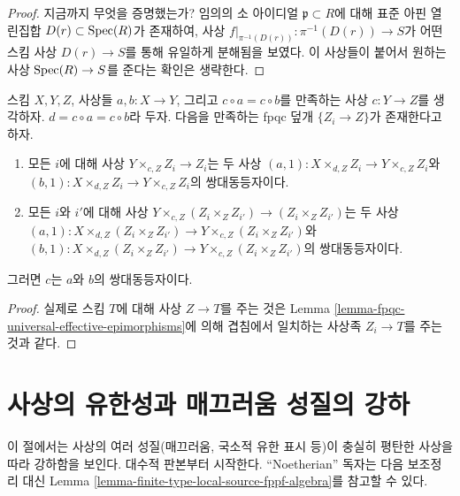 \begin{proof}
\medskip\noindent
지금까지 무엇을 증명했는가? 임의의 소 아이디얼 $\mathfrak p \subset R$에
대해 표준 아핀 열린집합 $D(r) \subset \mathop{\mathrm{Spec}}(R)$가 존재하여, 사상
$f|_{\pi^{-1}(D(r))} : \pi^{-1}(D(r)) \to S$가 어떤 스킴 사상
$D(r) \to S$를 통해 유일하게 분해됨을 보였다. 이 사상들이 붙어서 원하는
사상 $\mathop{\mathrm{Spec}}(R) \to S$를 준다는 확인은 생략한다.
\end{proof}

\begin{lemma}
\label{lemma-coequalizer-fpqc-local}
스킴 $X, Y, Z$, 사상들 $a, b : X \to Y$, 그리고
$c \circ a = c \circ b$를 만족하는 사상 $c : Y \to Z$를 생각하자.
$d = c \circ a = c \circ b$라 두자. 다음을 만족하는 fpqc 덮개
$\{Z_i \to Z\}$가 존재한다고 하자.
\begin{enumerate}
\item 모든 $i$에 대해 사상 $Y \times_{c, Z} Z_i \to Z_i$는 두 사상
$(a, 1) : X \times_{d, Z} Z_i \to Y \times_{c, Z} Z_i$와
$(b, 1) : X \times_{d, Z} Z_i \to Y \times_{c, Z} Z_i$의 쌍대동등자이다.
\item 모든 $i$와 $i'$에 대해 사상
$Y \times_{c, Z} (Z_i \times_Z Z_{i'}) \to (Z_i \times_Z Z_{i'})$는 두 사상
$(a, 1) : X \times_{d, Z} (Z_i \times_Z Z_{i'}) \to
Y \times_{c, Z} (Z_i \times_Z Z_{i'})$와
$(b, 1) : X \times_{d, Z} (Z_i \times_Z Z_{i'}) \to
Y \times_{c, Z} (Z_i \times_Z Z_{i'})$의 쌍대동등자이다.
\end{enumerate}
그러면 $c$는 $a$와 $b$의 쌍대동등자이다.
\end{lemma}

\begin{proof}
실제로 스킴 $T$에 대해 사상 $Z \to T$를 주는 것은 Lemma
\ref{lemma-fpqc-universal-effective-epimorphisms}에 의해 겹침에서 일치하는
사상족 $Z_i \to T$를 주는 것과 같다.
\end{proof}















\section{사상의 유한성과 매끄러움 성질의 강하}
\label{section-descent-finiteness-morphisms}

\noindent
이 절에서는 사상의 여러 성질(매끄러움, 국소적 유한 표시 등)이 충실히 평탄한
사상을 따라 강하함을 보인다. 대수적 판본부터 시작한다. ``Noetherian'' 독자는
다음 보조정리 대신 Lemma
\ref{lemma-finite-type-local-source-fppf-algebra}를 참고할 수 있다.

